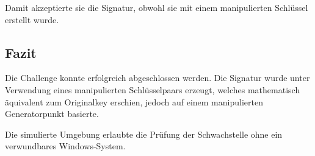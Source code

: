 \documentclass{article}
\begin{document}
Damit akzeptierte sie die Signatur, obwohl sie mit einem manipulierten Schlüssel erstellt wurde.

\subsection*{Fazit}

Die Challenge konnte erfolgreich abgeschlossen werden. Die Signatur wurde unter Verwendung eines manipulierten Schlüsselpaars erzeugt, welches mathematisch äquivalent zum Originalkey erschien, jedoch auf einem manipulierten Generatorpunkt basierte.

Die simulierte Umgebung erlaubte die Prüfung der Schwachstelle ohne ein verwundbares Windows-System.
\end{document}
